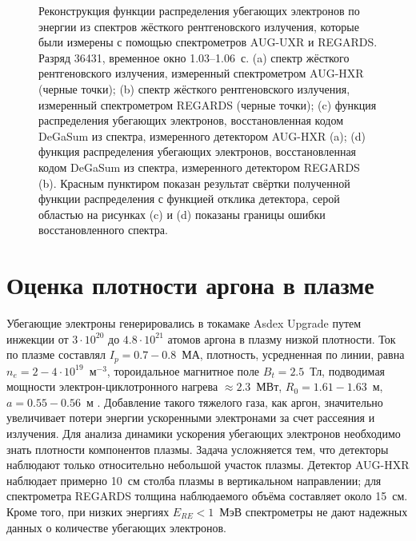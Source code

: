\begin{figure}[ht!]
  \caption{ Реконструкция функции распределения убегающих электронов по энергии из спектров жёсткого рентгеновского излучения, которые были измерены с помощью спектрометров AUG-UXR и REGARDS. Разряд 36431, временное окно 1.03--1.06~с. (a) спектр жёсткого рентгеновского излучения, измеренный спектрометром AUG-HXR (черные точки); (b) спектр жёсткого рентгеновского излучения, измеренный спектрометром REGARDS (черные точки); (c) функция распределения убегающих электронов, восстановленная кодом DeGaSum из спектра, измеренного детектором AUG-HXR (a); (d) функция распределения убегающих электронов, восстановленная кодом DeGaSum из спектра, измеренного детектором REGARDS (b). Красным пунктиром показан результат свёртки полученной функции распределения с функцией отклика детектора, серой областью на рисунках (c) и (d) показаны границы ошибки восстановленного спектра.~\cite{Shevelev2021} }
  \label{fig:asdexRegardsReSpectrumExamples}
\end{figure}

\FloatBarrier


\section{Оценка плотности аргона в плазме}

Убегающие электроны генерировались в токамаке Asdex Upgrade путем инжекции от $3 \cdot 10^{20}$ до $4.8 \cdot 10^{21}$ атомов аргона в плазму низкой плотности. Ток по плазме составлял $I_p = 0.7-0.8$~МА, плотность, усредненная по линии, равна $n_e = 2-4 \cdot 10^{19}$~м${}^{-3}$, тороидальное магнитное поле $B_t = 2.5$~Тл, подводимая мощности электрон-циклотронного нагрева $\approx 2.3$~МВт, $R_0 = 1.61-1.63$~м, $a = 0.55-0.56$~м \cite{Pautasso2020}. Добавление такого тяжелого газа, как аргон, значительно увеличивает потери энергии ускоренными электронами за счет рассеяния и излучения. Для анализа динамики ускорения убегающих электронов необходимо знать плотности компонентов плазмы. Задача усложняется тем, что детекторы наблюдают только относительно небольшой участок плазмы. Детектор AUG-HXR наблюдает примерно 10~см столба плазмы в вертикальном направлении; для спектрометра REGARDS толщина наблюдаемого объёма составляет около 15~см. Кроме того, при низких энергиях $E_{RE} < 1$~МэВ спектрометры не дают надежных данных о количестве убегающих электронов.~\cite{Shevelev2021}

